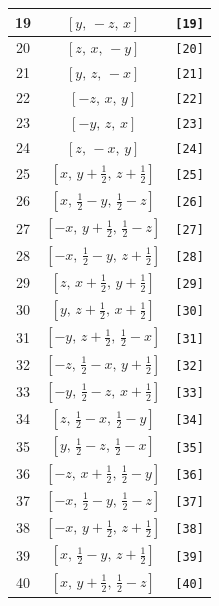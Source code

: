 \documentclass[fleqn,8pt]{jsarticle}
\begin{document}
\begin{longtable}{ccc}
19 & $\left[ y,\, - z,\, x \right]$ & {\tt [19]} \\ \hline
20 & $\left[ z,\, x,\, - y \right]$ & {\tt [20]} \\ \hline
21 & $\left[ y,\, z,\, - x \right]$ & {\tt [21]} \\ \hline
22 & $\left[ - z,\, x,\, y \right]$ & {\tt [22]} \\ \hline
23 & $\left[ - y,\, z,\, x \right]$ & {\tt [23]} \\ \hline
24 & $\left[ z,\, - x,\, y \right]$ & {\tt [24]} \\ \hline
25 & $\left[ x,\, y + \frac{1}{2},\, z + \frac{1}{2} \right]$ & {\tt [25]} \\ \hline
26 & $\left[ x,\, \frac{1}{2} - y,\, \frac{1}{2} - z \right]$ & {\tt [26]} \\ \hline
27 & $\left[ - x,\, y + \frac{1}{2},\, \frac{1}{2} - z \right]$ & {\tt [27]} \\ \hline
28 & $\left[ - x,\, \frac{1}{2} - y,\, z + \frac{1}{2} \right]$ & {\tt [28]} \\ \hline
29 & $\left[ z,\, x + \frac{1}{2},\, y + \frac{1}{2} \right]$ & {\tt [29]} \\ \hline
30 & $\left[ y,\, z + \frac{1}{2},\, x + \frac{1}{2} \right]$ & {\tt [30]} \\ \hline
31 & $\left[ - y,\, z + \frac{1}{2},\, \frac{1}{2} - x \right]$ & {\tt [31]} \\ \hline
32 & $\left[ - z,\, \frac{1}{2} - x,\, y + \frac{1}{2} \right]$ & {\tt [32]} \\ \hline
33 & $\left[ - y,\, \frac{1}{2} - z,\, x + \frac{1}{2} \right]$ & {\tt [33]} \\ \hline
34 & $\left[ z,\, \frac{1}{2} - x,\, \frac{1}{2} - y \right]$ & {\tt [34]} \\ \hline
35 & $\left[ y,\, \frac{1}{2} - z,\, \frac{1}{2} - x \right]$ & {\tt [35]} \\ \hline
36 & $\left[ - z,\, x + \frac{1}{2},\, \frac{1}{2} - y \right]$ & {\tt [36]} \\ \hline
37 & $\left[ - x,\, \frac{1}{2} - y,\, \frac{1}{2} - z \right]$ & {\tt [37]} \\ \hline
38 & $\left[ - x,\, y + \frac{1}{2},\, z + \frac{1}{2} \right]$ & {\tt [38]} \\ \hline
39 & $\left[ x,\, \frac{1}{2} - y,\, z + \frac{1}{2} \right]$ & {\tt [39]} \\ \hline
40 & $\left[ x,\, y + \frac{1}{2},\, \frac{1}{2} - z \right]$ & {\tt [40]} \\ \hline

\end{longtable}
\end{document}
